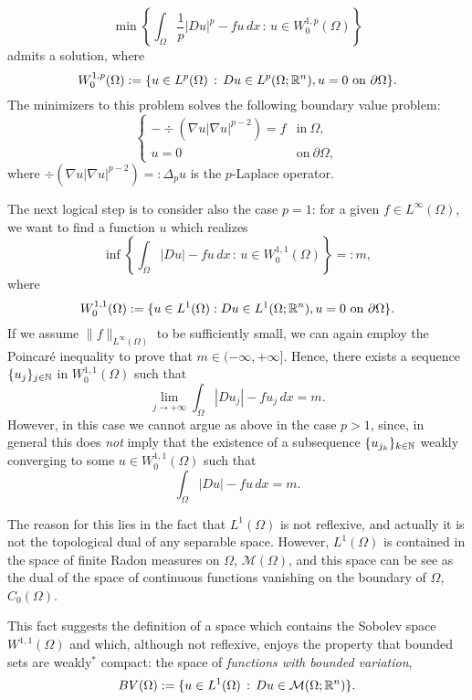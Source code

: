 \begin{equation*}
\min \left \{ \int_{\Omega} \frac{1}{p} |D u|^{p} - f u \, dx \, : \, u \in W^{1, p}_{0}(\Omega) \right \}
\end{equation*}
admits a solution, where $$W^{1, p}_{0}(\Omega) := \{ u \in L^{p}(\Omega) \, : \, Du \in L^{p}(\Omega; \mathbb{R}^{n}), u = 0 \ \text{on} \ \partial \Omega\}.$$ 
The minimizers to this problem solves the following boundary value problem:
\begin{equation*}
\begin{cases} 
- \div \left ( \nabla u |\nabla u|^{p - 2} \right ) = f & \text{in} \ \Omega, \\
u = 0 & \text{on} \ \partial \Omega,
\end{cases}
\end{equation*}
where $\div \left ( \nabla u |\nabla u|^{p - 2} \right ) =: \Delta_{p}u$ is the $p$-Laplace operator.

The next logical step is to consider also the case $p = 1$: for a given $f \in L^{\infty}(\Omega)$, we want to find a function $u$ which realizes
\begin{equation} \label{eq:min_probl_W_1}
\inf\left\{\int_\Omega |D u| - f u \, dx \,:\, u \in W^{1,1}_{0}(\Omega) \right\} =: m,
\end{equation}
where $$W^{1,1}_{0}(\Omega) := \{u \in L^1(\Omega) : Du \in L^1(\Omega; \mathbb{R}^n), u = 0 \ \text{on} \ \partial \Omega \}.$$
If we assume $\|f\|_{L^{\infty}(\Omega)}$ to be sufficiently small, we can again employ the Poincar\'e inequality to prove that $m \in (- \infty, + \infty]$. Hence, there exists a sequence $\{u_j \}_{j\in\mathbb{N}}$ in $W^{1,1}_{0}(\Omega)$ such that $$\lim_{j \to + \infty} \int_\Omega |D u_{j}| - f u_{j} \, dx = m.$$ 
However, in this case we cannot argue as above in the case $p > 1$, since, in general this does \emph{not} imply that the existence of a subsequence $\{u_{j_k}\}_{k\in\mathbb{N}}$ weakly converging to some $u \in W^{1,1}_{0}(\Omega)$ such that $$\int_\Omega |D u| - f u \, dx = m.$$ 

The reason for this lies in the fact that $L^1(\Omega)$ is not reflexive, and actually it is not the topological dual of any separable space. However, $L^{1}(\Omega)$ is contained in the space of finite Radon measures on $\Omega$, $\mathcal{M}(\Omega)$, and this space can be see as the dual of the space of continuous functions vanishing on the boundary of $\Omega$, $C_{0}(\Omega)$.

This fact suggests the definition of a space which contains the Sobolev space $W^{1, 1}(\Omega)$ and which, although not reflexive, enjoys the property that bounded sets are weakly$^*$ compact: the space of {\em functions with bounded variation},
\begin{equation*}
BV(\Omega) := \{ u \in L^{1}(\Omega) \, : \, Du \in \mathcal{M}(\Omega; \mathbb{R}^{n}) \}.
\end{equation*}

